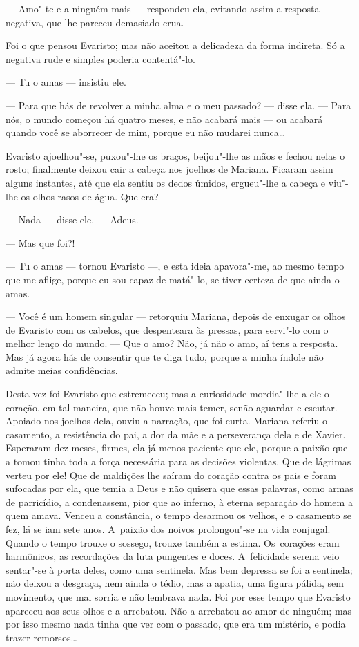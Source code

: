 \begin{linenumbers}
--- Amo"-te e a ninguém mais --- respondeu ela, evitando assim a resposta
negativa, que lhe pareceu demasiado crua.

Foi o que pensou Evaristo; mas não aceitou a delicadeza da forma
indireta. Só a negativa rude e simples poderia contentá"-lo.

--- Tu o amas --- insistiu ele.

--- Para que hás de revolver a minha alma e o meu passado? --- disse ela.
--- Para nós, o mundo começou há quatro meses, e não acabará mais --- ou
acabará quando você se aborrecer de mim, porque eu não mudarei nunca\ldots{}

Evaristo ajoelhou"-se, puxou"-lhe os braços, beijou"-lhe as mãos e fechou
nelas o rosto; finalmente deixou cair a cabeça nos joelhos de Mariana.
Ficaram assim alguns instantes, até que ela sentiu os dedos úmidos,
ergueu"-lhe a cabeça e viu"-lhe os olhos rasos de água. Que era?

--- Nada --- disse ele. --- Adeus.

--- Mas que foi?!

--- Tu o amas --- tornou Evaristo ---, e esta ideia apavora"-me, ao mesmo
tempo que me aflige, porque eu sou capaz de matá"-lo, se tiver certeza de
que ainda o amas.

--- Você é um homem singular --- retorquiu Mariana, depois de enxugar os
olhos de Evaristo com os cabelos, que despenteara às pressas, para
servi"-lo com o melhor lenço do mundo. --- Que o amo? Não, já não o amo,
aí tens a resposta. Mas já agora hás de consentir que te diga tudo,
porque a minha índole não admite meias confidências.

Desta vez foi Evaristo que estremeceu; mas a curiosidade mordia"-lhe a
ele o coração, em tal maneira, que não houve mais temer, senão aguardar
e escutar. Apoiado nos joelhos dela, ouviu a narração, que foi curta.
Mariana referiu o casamento, a resistência do pai, a dor da mãe e a
perseverança dela e de Xavier. Esperaram dez meses, firmes, ela já menos
paciente que ele, porque a paixão que a tomou tinha toda a força
necessária para as decisões violentas. Que de lágrimas verteu por ele!
Que de maldições lhe saíram do coração contra os pais e foram sufocadas
por ela, que temia a Deus e não quisera que essas palavras, como armas
de parricídio, a condenassem, pior que ao inferno, à eterna separação do
homem a quem amava. Venceu a constância, o tempo desarmou os velhos, e o
casamento se fez, lá se iam sete anos. A~paixão dos noivos prolongou"-se
na vida conjugal. Quando o tempo trouxe o sossego, trouxe também a
estima. Os~corações eram harmônicos, as recordações da luta pungentes e
doces. A~felicidade serena veio sentar"-se à porta deles, como uma
sentinela. Mas bem depressa se foi a sentinela; não deixou a desgraça,
nem ainda o tédio, mas a apatia, uma figura pálida, sem movimento, que
mal sorria e não lembrava nada. Foi por esse tempo que Evaristo apareceu
aos seus olhos e a arrebatou. Não a arrebatou ao amor de ninguém; mas
por isso mesmo nada tinha que ver com o passado, que era um mistério, e
podia trazer remorsos\ldots{}


\end{linenumbers}
